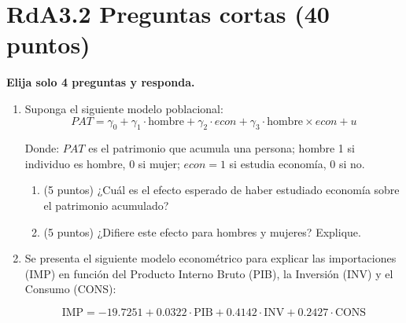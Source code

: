 \documentclass[10pt,a4paper]{article}
\begin{document}
\section{RdA3.2  Preguntas cortas (40 puntos)}
{\bf Elija solo 4 preguntas y responda. }
\begin{enumerate}

\item Suponga el siguiente modelo poblacional:
$$PAT = \gamma_0 + \gamma_1 \cdot \text{hombre} + \gamma_2 \cdot econ + \gamma_3 \cdot \text{hombre} \times econ +u$$

Donde: $PAT$ es el patrimonio que acumula una persona; hombre 1 si individuo es hombre, 0 si mujer; $econ = 1$ si estudia economía, 0 si no.
\begin{enumerate}
    \item[(a)] (5 puntos) ¿Cuál es el efecto esperado de haber estudiado economía sobre el patrimonio acumulado?
    \item[(b)] (5 puntos) ¿Difiere este efecto para
hombres y mujeres? Explique.
\end{enumerate}

\item 
Se presenta el siguiente modelo econométrico para explicar las importaciones (IMP) en función del Producto Interno Bruto (PIB), la Inversión (INV) y el Consumo (CONS):

\[
\text{IMP} = -19.7251 + 0.0322 \cdot \text{PIB} + 0.4142 \cdot \text{INV} + 0.2427 \cdot \text{CONS}
\]


\end{enumerate}
\end{document}
